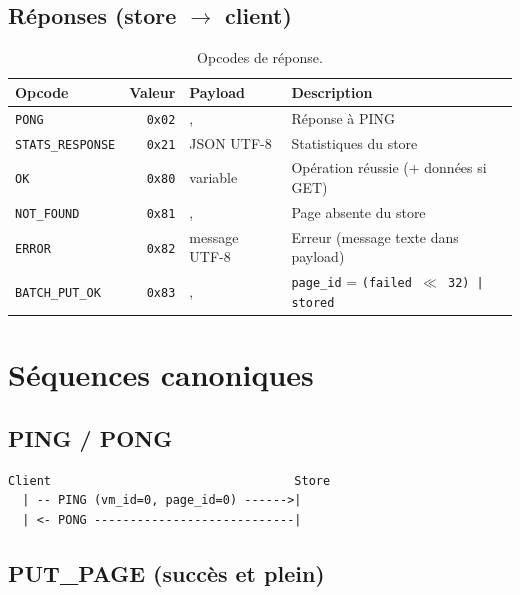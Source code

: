 \subsection{Réponses (store $\to$ client)}

\begin{table}[H]
\centering
\small
\caption{Opcodes de réponse.}
\begin{tabular}{lrlp{7cm}}
\toprule
\textbf{Opcode} & \textbf{Valeur} & \textbf{Payload} & \textbf{Description} \\
\midrule
\texttt{PONG}            & \texttt{0x02} &,             & Réponse à PING \\
\texttt{STATS\_RESPONSE} & \texttt{0x21} & JSON UTF-8      & Statistiques du store \\
\texttt{OK}              & \texttt{0x80} & variable        & Opération réussie (+ données si GET) \\
\texttt{NOT\_FOUND}      & \texttt{0x81} &,             & Page absente du store \\
\texttt{ERROR}           & \texttt{0x82} & message UTF-8   & Erreur (message texte dans payload) \\
\texttt{BATCH\_PUT\_OK}  & \texttt{0x83} &,             & \texttt{page\_id} = \texttt{(failed $\ll$ 32) | stored} \\
\bottomrule
\end{tabular}

\label{tab:opcodes-rsp}
\end{table}

\section{Séquences canoniques}

\subsection{PING / PONG}

\begin{lstlisting}[basicstyle=\ttfamily\footnotesize, frame=single]
Client                                  Store
  | -- PING (vm_id=0, page_id=0) ------>|
  | <- PONG ----------------------------|
\end{lstlisting}

\subsection{PUT\_PAGE (succès et plein)}

